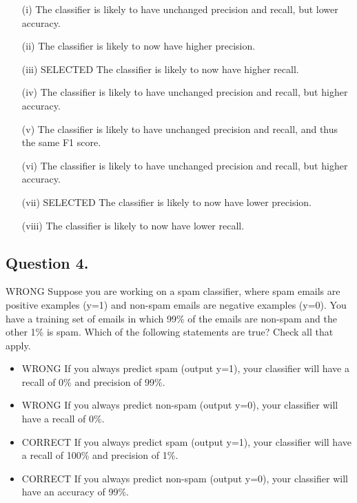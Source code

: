 \documentclass[11pt]{article} %
\begin{document}
\begin{itemize}
	\item[(i)] The classifier is likely to have unchanged precision and recall, but lower accuracy.
	
\item[(ii)] 	The classifier is likely to now have higher precision.
	
\item[(iii)] 	SELECTED The classifier is likely to now have higher recall.
	
\item[(iv)]	The classifier is likely to have unchanged precision and recall, but higher accuracy.
	
	
\item[(v)] 	The classifier is likely to have unchanged precision and recall, and thus the same F1 score.
	
\item[(vi)] 	The classifier is likely to have unchanged precision and recall, but	higher accuracy.
	
	
\item[(vii)] 	SELECTED The classifier is likely to now have lower precision.
	
\item[(viii)]	The classifier is likely to now have lower recall.
\end{itemize}

\subsection*{Question 4.} WRONG
Suppose you are working on a spam classifier, where spam emails are positive examples (y=1) and non-spam emails are
negative examples (y=0). You have a training set of emails in which 99\% of the emails are non-spam and the other 1\% is
spam. Which of the following statements are true? Check all that apply.

\begin{itemize}
	\item WRONG If you always predict spam (output y=1), your classifier will have a recall of 0\% and precision of 99\%.
	
	
	\item WRONG If you always predict non-spam (output y=0), your classifier will have a recall of 0\%.
	
	
	\item CORRECT If you always predict spam (output y=1), your classifier will have a recall of 100\% and precision of 1\%.
	
	
	
	\item CORRECT If you always predict non-spam (output y=0), your classifier will have an accuracy of 99\%.
\end{itemize}
\end{document}
